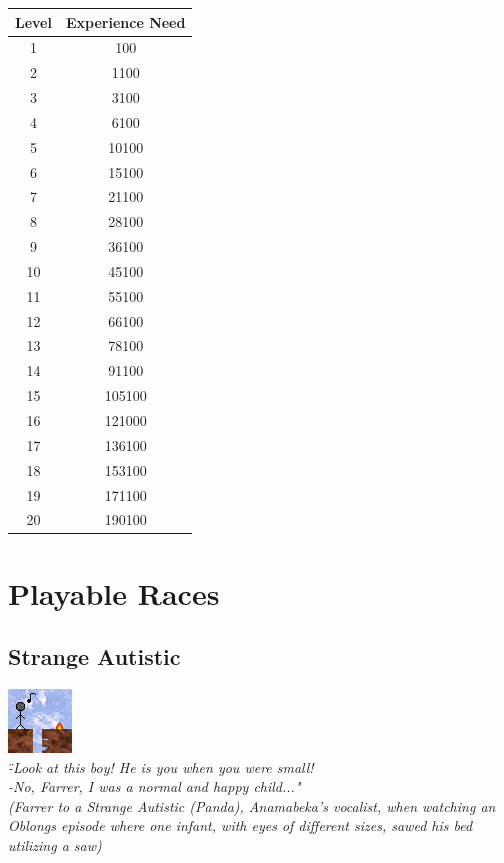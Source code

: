 \documentclass[ letterpaper,12pt]{article}
\begin{document}
\begin{center}
\begin{tabular}{|c||c|}
\hline
Level & Experience Need\\
\hline
1 & 100\\
\hline
2 & 1100\\
\hline
3 & 3100\\
\hline
4 & 6100\\
\hline
5 & 10100\\
\hline
6 & 15100\\
\hline
7 & 21100\\
\hline
8 & 28100\\
\hline
9 & 36100\\
\hline
10 & 45100\\
\hline
11 & 55100\\
\hline
12 & 66100\\
\hline
13 & 78100\\
\hline
14 & 91100\\
\hline
15 & 105100\\
\hline
16 & 121000\\
\hline
17 & 136100\\
\hline
18 & 153100\\
\hline
19 & 171100\\
\hline
20 & 190100\\
\hline
\end{tabular}
\end{center}

\section{Playable Races}

\subsection{Strange Autistic}
\includegraphics{../data/races/Img/autista.png}\\
{\it \" -Look at this boy! He is you when you were small!\\
 -No, Farrer, I was a normal and happy child..."\\
(Farrer to a Strange Autistic (Panda), Anamabeka's vocalist, when watching an Oblongs episode where one infant, with eyes of different sizes, sawed his bed utilizing a saw)\\}
\end{document}
